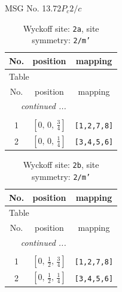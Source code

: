 \documentclass[fleqn,8pt]{jsarticle}
\begin{document}
\setcounter{MaxMatrixCols}{32}

\renewcommand{\tablename}{Table~}
\renewcommand{\figurename}{Figure~}
\begin{center}
\LARGE
MSG No. 13.72\quad$P_{c}2/c$
\end{center}
\renewcommand{\arraystretch}{1.2}
\begin{longtable}{ccc}
\caption{Wyckoff site: {\tt 2a}, site symmetry: {\tt 2/m'}}
 \\
 \hline \hline
No. & position & mapping \\ \hline \endfirsthead

\multicolumn{2}{l}{\tablename\ \thetable{}} \\
 \hline \hline
No. & position & mapping \\ \hline \endhead

 \hline \hline
\multicolumn{2}{r}{\footnotesize\it continued ...} \\ \endfoot

 \hline \hline
\multicolumn{2}{r}{} \\ \endlastfoot

1 & $\left[ 0,\, 0,\, \frac{3}{4} \right]$ & {\tt [1,2,7,8]} \\ \hline
2 & $\left[ 0,\, 0,\, \frac{1}{4} \right]$ & {\tt [3,4,5,6]} \\
\end{longtable}
\renewcommand{\arraystretch}{1.2}
\begin{longtable}{ccc}
\caption{Wyckoff site: {\tt 2b}, site symmetry: {\tt 2/m'}}
 \\
 \hline \hline
No. & position & mapping \\ \hline \endfirsthead

\multicolumn{2}{l}{\tablename\ \thetable{}} \\
 \hline \hline
No. & position & mapping \\ \hline \endhead

 \hline \hline
\multicolumn{2}{r}{\footnotesize\it continued ...} \\ \endfoot

 \hline \hline
\multicolumn{2}{r}{} \\ \endlastfoot

1 & $\left[ 0,\, \frac{1}{2},\, \frac{3}{4} \right]$ & {\tt [1,2,7,8]} \\ \hline
2 & $\left[ 0,\, \frac{1}{2},\, \frac{1}{4} \right]$ & {\tt [3,4,5,6]} \\
\end{longtable}
\end{document}
